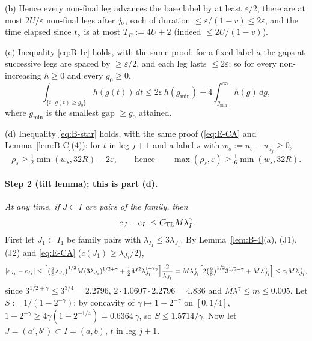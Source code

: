 (b) Hence every non-final leg advances the base label by at least $\varepsilon/2$, there are at most $2U/\varepsilon$ non-final legs
after $j_{\mathrm s}$, each of duration $\le\varepsilon/(1-v)\le2\varepsilon$, and the time elapsed since $t_{\mathrm s}$ is at most $T_B:=4U+2$
(indeed $\le2U/(1-v)$).

(c) Inequality \eqref{eq:B-1c} holds, with the same proof: for a fixed label $a$ the gaps at successive legs are spaced by
$\ge\varepsilon/2$, and each leg lasts $\le2\varepsilon$; so for every non-increasing $h\ge0$ and every $g_0\ge0$,
\begin{equation}\label{eq:E-1c}
\int_{\{t:\,g(t)\ge g_0\}}h(g(t))\,dt\le2\varepsilon\,h(g_{\min})+4\int_{g_{\min}}^\infty h(g)\,dg,
\end{equation}
where $g_{\min}$ is the smallest gap $\ge g_0$ attained.

(d) Inequality \eqref{eq:B-star} holds, with the same proof (\eqref{eq:E-CA} and Lemma~\ref{lem:B-C}(4)): for $t$ in leg $j+1$ and
a label $s$ with $w_s:=u_s-u_{a_j}\ge0$,
\begin{equation}\label{eq:E-star}
\rho_s\ge\tfrac12\min(w_s,32R)-2\varepsilon,\qquad\text{hence}\qquad\max(\rho_s,\varepsilon)\ge\tfrac16\min(w_s,32R).
\end{equation}

\paragraph{Step 2 (tilt lemma); this is part (d).}
\emph{At any time, if $J\subset I$ are pairs of the family, then}
\begin{equation}\label{eq:E-TL}
|e_J-e_I|\le C_{\mathrm{TL}} M\lambda_I^\gamma .
\end{equation}
First let $J_1\subset I_1$ be family pairs with $\lambda_{I_1}\le3\lambda_{J_1}$. By Lemma~\ref{lem:B-4}(a), (J1), (J2) and
\eqref{eq:E-CA} ($c(J_1)\ge\lambda_{J_1}/2$),
\[
|e_{J_1}-e_{I_1}|\le\Bigl[\bigl(\tfrac98\lambda_{J_1}\bigr)^{1/2}M(3\lambda_{J_1})^{1/2+\gamma}
+\tfrac12M^2\lambda_{J_1}^{1+2\gamma}\Bigr]\frac2{\lambda_{J_1}}
=M\lambda_{J_1}^\gamma\Bigl[2\bigl(\tfrac98\bigr)^{1/2}3^{1/2+\gamma}+M\lambda_{J_1}^\gamma\Bigr]\le c_{\mathrm t}M\lambda_{J_1}^\gamma,
\]
since $3^{1/2+\gamma}\le3^{3/4}=2.2796$, $2\cdot1.0607\cdot2.2796=4.836$ and $M\lambda^\gamma\le m\le0.005$. Let
$S:=1/(1-2^{-\gamma})$; by concavity of $\gamma\mapsto1-2^{-\gamma}$ on $[0,1/4]$,
$1-2^{-\gamma}\ge4\gamma(1-2^{-1/4})=0.6364\,\gamma$, so $S\le1.5714/\gamma$. Now let $J=(a',b')\subset I=(a,b)$, $t$ in leg $j+1$.

